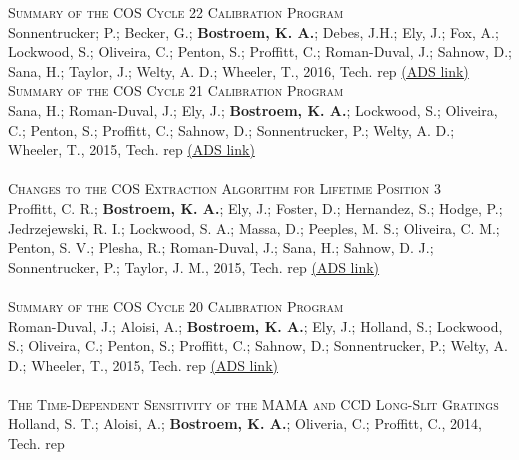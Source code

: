 \vspace{-0.1in}   
\textsc{Summary of the COS Cycle 22 Calibration Program}\\  
Sonnentrucker; P.; Becker, G.; {\bf Bostroem, K. A.}; Debes, J.H.; Ely, J.; Fox, A.; Lockwood, S.; Oliveira, C.; Penton, S.; Proffitt, C.; Roman-Duval, J.; Sahnow, D.; Sana, H.; Taylor, J.; Welty, A. D.; Wheeler, T., 2016, Tech. rep 
\color{blue}\href{https://ui.adsabs.harvard.edu/#abs/2016cos..rept....3S/abstract}{(ADS link)}\color{black}\\ %
\textsc{Summary of the COS Cycle 21 Calibration Program}\\ 
Sana, H.; Roman-Duval, J.; Ely, J.; {\bf Bostroem, K. A.}; Lockwood, S.; Oliveira, C.; Penton, S.; Proffitt, C.; Sahnow, D.; Sonnentrucker, P.; Welty, A. D.; Wheeler, T., 2015, Tech. rep 
\color{blue}\href{https://ui.adsabs.harvard.edu/#abs/2015cos..rept....6S/abstract}{(ADS link)}\color{black}\\ %
\\
\textsc{Changes to the COS Extraction Algorithm for Lifetime Position 3}\\ 
Proffitt, C. R.; {\bf Bostroem, K. A.}; Ely, J.; Foster, D.; Hernandez, S.; Hodge, P.; Jedrzejewski, R. I.; Lockwood, S. A.; Massa, D.; Peeples, M. S.; Oliveira, C. M.; Penton, S. V.; Plesha, R.; Roman-Duval, J.; Sana, H.; Sahnow, D. J.; Sonnentrucker, P.; Taylor, J. M.,  2015, Tech. rep 
\color{blue}\href{https://ui.adsabs.harvard.edu/#abs/2015cos..rept....3P/abstract}{(ADS link)}\color{black}\\ %
\\
\textsc{Summary of the COS Cycle 20 Calibration Program}\\ 
Roman-Duval, J.; Aloisi, A.; {\bf Bostroem, K. A.}; Ely, J.; Holland, S.; Lockwood, S.; Oliveira, C.; Penton, S.; Proffitt, C.; Sahnow, D.; Sonnentrucker, P.; Welty, A. D.; Wheeler, T., 2015, Tech. rep 
\color{blue}\href{https://ui.adsabs.harvard.edu/#abs/2015cos..rept....2R/abstract}{(ADS link)}\color{black}\\ %
\\
\textsc{The Time-Dependent Sensitivity of the MAMA and CCD Long-Slit Gratings}\\ 
Holland, S. T.; Aloisi, A.; {\bf Bostroem, K. A.}; Oliveria, C.; Proffitt, C.,  2014, Tech. rep 
